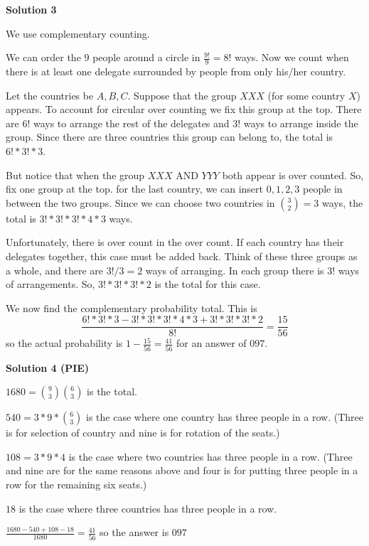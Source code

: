 \begin{enumerate}
 


 



\textbf{Solution 3}

We use complementary counting.

 We can order the $9$ people around a circle in $\frac{9!}{9} = 8!$ ways. Now we count when there is at least one delegate surrounded by people from only his/her country.

 Let the countries be $A,B,C$. Suppose that the group $XXX$ (for some country $X$) appears. To account for circular over counting we fix this group at the top. There are $6!$ ways to arrange the rest of the delegates and $3!$ ways to arrange inside the group. Since there are three countries this group can belong to, the total is $6!*3!*3$.

 But notice that when the group $XXX$ AND $YYY$ both appear is over counted. So, fix one group at the top. for the last country, we can insert $0,1,2,3$ people in between the two groups. Since we can choose two countries in $\binom{3}{2} = 3$ ways, the total is $3!*3!*3!*4*3$ ways.

 Unfortunately, there is over count in the over count. If each country has their delegates together, this case must be added back. Think of these three groups as a whole, and there are $3!/3 = 2$ ways of arranging. In each group there is $3!$ ways of arrangements. So, $3!*3!*3!*2$ is the total for this case.

 We now find the complementary probability total. This is 
 \[\frac{6!*3!*3 - 3!*3!*3!*4*3 + 3!*3!*3!*2}{8!} = \frac{15}{56}\] so the actual probability is $1-\frac{15}{56} = \frac{41}{56}$ for an answer of $\boxed{097}$.

 



\textbf{Solution 4 (PIE)}

$1680= \binom{9}{3} \binom{6}{3}$ is the total.

 $540 = 3* 9* \binom{6}{3}$ is the case where one country has three people in a row. (Three is for selection of country and nine is for rotation of the seats.)

 $108 = 3* 9* 4$ is the case where two countries has three people in a row. (Three and nine are for the same reasons above and four is for putting three people in a row for the remaining six seats.)

 $18$ is the case where three countries has three people in a row.

 
$\frac{1680-540+108-18}{1680}=\frac{41}{56}$ so the answer is $\boxed{097}$


\end{enumerate}
